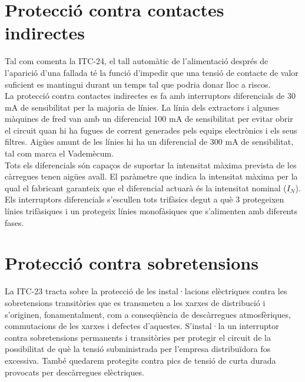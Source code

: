 \section{Protecció contra contactes indirectes}
Tal com comenta la ITC-24, el tall automàtic de l'alimentació després de l'aparició d'una fallada té la funció d'impedir que una tensió de contacte de valor suficient es mantingui durant un temps tal que podria donar lloc a riscos.\\
\newline La protecció contra contactes indirectes es fa amb interruptors diferencials de 30 mA de sensibilitat per la majoria de línies. La línia dels extractors i algunes màquines de fred van amb un diferencial 100 mA de sensibilitat per evitar obrir el circuit quan hi ha fugues de corrent generades pels equips electrònics i els seus filtres. Aigües amunt de les línies hi ha un diferencial de 300 mA de sensibilitat, tal com marca el Vademècum.\\
\newline Tots els diferencials són capaços de suportar la intensitat màxima prevista de les càrregues tenen aigües avall. El paràmetre que indica la intensitat màxima per la qual el fabricant garanteix que el diferencial actuarà és la intensitat nominal ($I_{N}$).
\newline Els interruptors diferencials s'escullen tots trifàsics degut a què 3 protegeixen línies trifàsiques i un protegeix línies monofàsiques que s'alimenten amb diferents fases.


\section{Protecció contra sobretensions}
La ITC-23 tracta sobre la protecció de les instal·lacions elèctriques contra les sobretensions transitòries que es transmeten a les xarxes de distribució i s'originen, fonamentalment, com a conseqüència de descàrregues atmosfèriques, commutacions de les xarxes i defectes d'aquestes.
S'instal·la un interruptor contra sobretensions permanents i transitòries per protegir el circuit de la possibilitat de què la tensió subministrada per l'empresa distribuïdora fos excessiva. També quedarem protegits contra pics de tensió de curta durada provocats per descàrregues elèctriques.

\clearpage